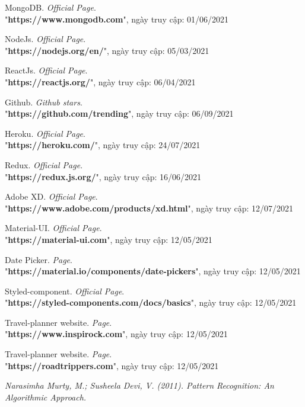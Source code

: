 \documentclass[12pt,a4paper]{report}
\begin{document}
\begin{thebibliography}{80}

MongoDB. \textit{Official Page}.\\
"\textbf{https://www.mongodb.com}", ngày truy cập: 01/06/2021

NodeJs. \textit{Official Page}.\\
"\textbf{https://nodejs.org/en/}", ngày truy cập: 05/03/2021

ReactJs. \textit{Official Page}.\\
"\textbf{https://reactjs.org/}", ngày truy cập: 06/04/2021

Github. \textit{Github stars}.\\
"\textbf{https://github.com/trending}", ngày truy cập: 06/09/2021

Heroku. \textit{Official Page}.\\
"\textbf{https://heroku.com/}", ngày truy cập: 24/07/2021

Redux. \textit{Official Page}.\\
"\textbf{https://redux.js.org/}", ngày truy cập: 16/06/2021

Adobe XD. \textit{Official Page}.\\
"\textbf{https://www.adobe.com/products/xd.html}", ngày truy cập: 12/07/2021

Material-UI. \textit{Official Page}.\\
"\textbf{https://material-ui.com}", ngày truy cập: 12/05/2021

Date Picker. \textit{Page}.\\
"\textbf{https://material.io/components/date-pickers}", ngày truy cập: 12/05/2021

Styled-component. \textit{Official Page}.\\
"\textbf{https://styled-components.com/docs/basics}", ngày truy cập: 12/05/2021

Travel-planner website. \textit{Page}.\\
"\textbf{https://www.inspirock.com}", ngày truy cập: 12/05/2021

Travel-planner website. \textit{Page}.\\
"\textbf{https://roadtrippers.com}", ngày truy cập: 12/05/2021

\textit{Narasimha Murty, M.; Susheela Devi, V. (2011). Pattern Recognition: An Algorithmic Approach.}


\end{thebibliography}
\end{document}
